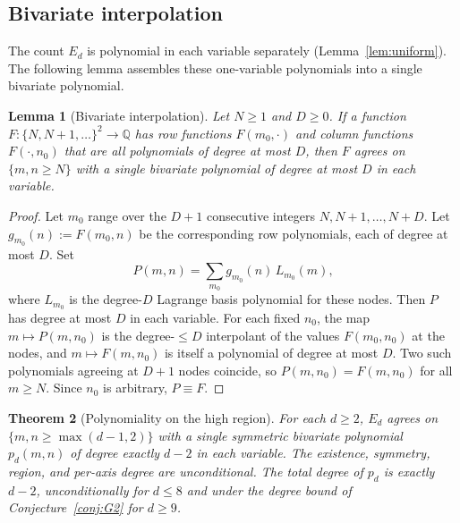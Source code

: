 \documentclass[11pt]{article}
\newtheorem{theorem}{Theorem}[section]
\newtheorem{lemma}[theorem]{Lemma}
\theoremstyle{definition}
\theoremstyle{remark}
\newcommand{\Q}{\mathbb{Q}}
\begin{document}
\subsection{Bivariate interpolation}

The count $E_d$ is polynomial in each variable separately
(Lemma~\ref{lem:uniform}). The following lemma assembles these one-variable
polynomials into a single bivariate polynomial.

\begin{lemma}[Bivariate interpolation]\label{lem:interp}
Let $N\ge1$ and $D\ge0$. If a function $F:\{N,N+1,\dots\}^2\to\Q$ has row
functions $F(m_0,\cdot)$ and column functions $F(\cdot,n_0)$ that are all
polynomials of degree at most $D$, then $F$ agrees on $\{m,n\ge N\}$ with a
single bivariate polynomial of degree at most $D$ in each variable.
\end{lemma}

\begin{proof}
Let $m_0$ range over the $D+1$ consecutive integers $N,N+1,\dots,N+D$. Let
$g_{m_0}(n):=F(m_0,n)$ be the corresponding row polynomials, each of degree at
most $D$. Set
\[
  P(m,n)=\sum_{m_0}g_{m_0}(n)\,L_{m_0}(m),
\]
where $L_{m_0}$ is the degree-$D$ Lagrange basis polynomial for these nodes. Then
$P$ has degree at most $D$ in each variable. For each fixed $n_0$, the map
$m\mapsto P(m,n_0)$ is the degree-$\le D$ interpolant of the values $F(m_0,n_0)$
at the nodes, and $m\mapsto F(m,n_0)$ is itself a polynomial of degree at most
$D$. Two such polynomials agreeing at $D+1$ nodes coincide, so
$P(m,n_0)=F(m,n_0)$ for all $m\ge N$. Since $n_0$ is arbitrary, $P\equiv F$.
\end{proof}

\begin{theorem}[Polynomiality on the high region]\label{thm:poly}
For each $d\ge2$, $E_d$ agrees on $\{m,n\ge\max(d-1,2)\}$ with a single symmetric
bivariate polynomial $p_d(m,n)$ of degree exactly $d-2$ in each variable. The
existence, symmetry, region, and per-axis degree are unconditional. The total
degree of $p_d$ is exactly $d-2$, unconditionally for $d\le8$ and under the
degree bound of Conjecture~\ref{conj:G2} for $d\ge9$.
\end{theorem}
\end{document}
